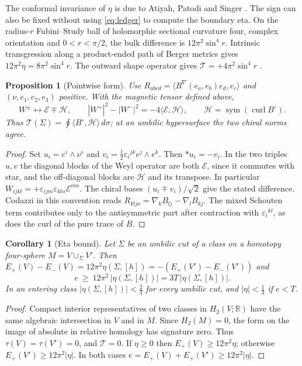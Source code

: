\documentclass[11pt,letterpaper]{article}
\numberwithin{equation}{section}
\newtheorem{proposition}[theorem]{Proposition}
\newtheorem{corollary}[theorem]{Corollary}
\theoremstyle{definition}
\DeclareMathOperator{\curl}{curl}
\newcommand{\cT}{\mathcal T}
\begin{document}
The conformal invariance of \(\eta\) is due to Atiyah, Patodi and Singer
\cite{APS1975SpectralII}. The sign can also be fixed without using
\eqref{eq:ledger} to compute the boundary eta. On the radius-\(r\)
Fubini--Study ball of holomorphic sectional curvature four, complex
orientation and \(0<r<\pi/2\), the bulk difference is
\(12\pi^2\sin^4r\). Intrinsic transgression along a product-ended path of
Berger metrics gives \(12\pi^2\eta=8\pi^2\sin^4r\). The outward shape
operator gives \(\cT=+4\pi^2\sin^4r\)
\cite[LED, Fubini--Study balls]{Baker2026MarkedCutCalculations}.

\begin{proposition}[Pointwise form]\label{prop:EH}
Use \(R_{abcd}=\langle R^\nabla(e_a,e_b)e_d,e_c\rangle\) and
\((\nu,e_1,e_2,e_3)\) positive. With the magnetic tensor defined above,
\[
 W^\pm \longleftrightarrow \mathcal E\mp\mathcal H,\qquad
 |W^+|^2-|W^-|^2=-4\langle\mathcal E,\mathcal H\rangle,\qquad
 \mathcal H=\operatorname{sym}(\curl B^\circ).
\]
Thus \(\cT(\Sigma)=\oint\langle B^\circ,\mathcal H\rangle\,d\sigma\);
at an umbilic hypersurface the two chiral norms agree.
\end{proposition}
\begin{proof}
Set \(u_i=e^i\wedge\nu^\flat\) and
\(v_i=\tfrac12\varepsilon_i{}^{jk}e^j\wedge e^k\). Then \(*u_i=-v_i\).
In the two triples \(u,v\) the diagonal blocks of the Weyl operator are
both \(\mathcal E\), since it commutes with star, and the off-diagonal
blocks are \(\mathcal H\) and its transpose. In particular
\(W_{ijkl}=+\varepsilon_{ijm}\varepsilon_{kln}\mathcal E^{mn}\).
The chiral bases \((u_i\mp v_i)/\sqrt2\) give the stated difference.
Codazzi in this convention reads
\(R_{klj\nu}=\nabla_k B_{lj}-\nabla_l B_{kj}\). The mixed Schouten
term contributes only to the antisymmetric part after contraction with
\(\varepsilon_i{}^{kl}\), as does the curl of the pure trace of \(B\).
\end{proof}

\begin{corollary}[Eta bound]\label{cor:eta}
Let \(\Sigma\) be an umbilic cut of a class on a homotopy four-sphere
\(M=V\cup_\Sigma V'\). Then
\(E_+(V)-E_-(V)=12\pi^2\eta(\Sigma,[h])=-(E_+(V')-E_-(V'))\) and
\[
 e\ \ge\ 12\pi^2\,|\eta(\Sigma,[h])|=3T\,|\eta(\Sigma,[h])| .
\]
In an entering class \(|\eta(\Sigma,[h])|<\tfrac23\) for every umbilic
cut, and \(|\eta|<\tfrac13\) if \(e<T\).
\end{corollary}
\begin{proof}
Compact interior representatives of two classes in \(H_2(V;\mathbb R)\)
have the same algebraic intersection in \(V\) and in \(M\). Since
\(H_2(M)=0\), the form on the image of absolute in relative homology
has signature zero. Thus
\(\tau(V)=\tau(V')=0\), and \(\cT=0\). If \(\eta\ge0\) then
\(E_+(V)\ge12\pi^2\eta\); otherwise \(E_+(V')\ge12\pi^2|\eta|\). In both
cases \(e=E_+(V)+E_+(V')\ge12\pi^2|\eta|\).
\end{proof}
\end{document}
